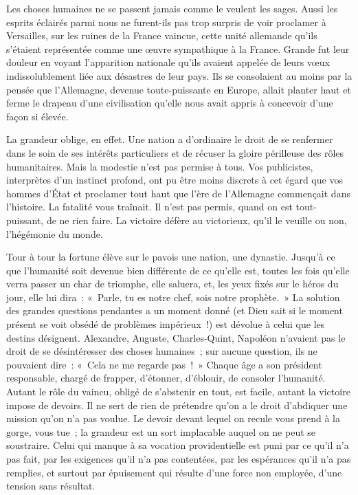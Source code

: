 \documentclass[french,twoside]{book} %
\newcommand\orgName[1]{#1}
\newcommand\persName[1]{#1}
\newcommand\placeName[1]{#1}
\begin{document}
Les choses humaines ne se passent jamais comme le veulent les sages. Aussi les esprits éclairés parmi nous ne furent-ils pas trop surpris de voir proclamer à {\placeName Versailles}, sur les ruines de la {\orgName France} vaincue, cette unité allemande qu’ils s’étaient représentée comme une œuvre sympathique à la {\orgName France}. Grande fut leur douleur en voyant l’apparition nationale qu’ils avaient appelée de leurs vœux indissolublement liée aux désastres de leur pays. Ils se consolaient au moins par la pensée que l’{\orgName Allemagne}, devenue toute-puissante en {\placeName Europe}, allait planter haut et ferme le drapeau d’une civilisation qu’elle nous avait appris à concevoir d’une façon si élevée.\par
La grandeur oblige, en effet. Une nation a d’ordinaire le droit de se renfermer dans le soin de ses intérêts particuliers et de récuser la gloire périlleuse des rôles humanitaires. Mais la modestie n’est pas permise à tous. Vos publicistes, interprètes d’un instinct profond, ont pu être moins discrets à cet égard que vos hommes d’État et proclamer tout haut que l’ère de l’{\orgName Allemagne} commençait dans l’histoire. La fatalité vous traînait. Il n’est pas permis, quand on est tout-puissant, de ne rien faire. La victoire défère au victorieux, qu’il le veuille ou non, l’hégémonie du monde.\par
Tour à tour la fortune élève sur le pavois une nation, une dynastie. Jusqu’à ce que l’humanité soit devenue bien différente de ce qu’elle est, toutes les fois qu’elle verra passer un char de triomphe, elle saluera, et, les yeux fixés sur le héros du jour, elle lui dira : « Parle, tu es notre chef, sois notre prophète. » La solution des grandes questions pendantes a un moment donné (et {\persName Dieu} sait si le moment présent se voit obsédé de problèmes impérieux !) est dévolue à celui que les destins désignent. {\persName Alexandre}, {\persName Auguste}, {\persName Charles-Quint}, {\persName Napoléon} n’avaient pas le droit de se désintéresser des choses humaines ; sur aucune question, ils ne pouvaient dire : « Cela ne me regarde pas ! » Chaque âge a son président responsable, chargé de frapper, d’étonner, d’éblouir, de consoler l’humanité. Autant le rôle du vaincu, obligé de s’abstenir en tout, est facile, autant la victoire impose de devoirs. Il ne sert de rien de prétendre qu’on a le droit d’abdiquer une mission qu’on n’a pas voulue. Le devoir devant lequel on recule vous prend à la gorge, vous tue ; la grandeur est un sort implacable auquel on ne peut se soustraire. Celui qui manque à sa vocation providentielle est puni par ce qu’il n’a pas fait, par les exigences qu’il n’a pas contentées, par les espérances qu’il n’a pas remplies, et surtout par épuisement qui résulte d’une force non employée, d’une tension sans résultat.\par
\end{document}
